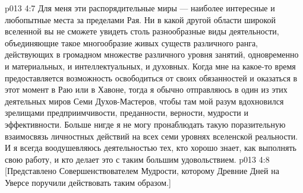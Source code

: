 \vs p013 4:7 Для меня эти распорядительные миры --- наиболее интересные и любопытные места за пределами Рая. Ни в какой другой области широкой вселенной вы не сможете увидеть столь разнообразные виды деятельности, объединяющие такое многообразие живых существ различного ранга, действующих в громадном множестве различного уровня занятий, одновременно и материальных, и интеллектуальных, и духовных. Когда мне на какое\hyp{}то время предоставляется возможность освободиться от своих обязанностей и оказаться в этот момент в Раю или в Хавоне, тогда я обычно отправляюсь в один из этих деятельных миров Семи Духов\hyp{}Мастеров, чтобы там мой разум вдохновился зрелищами предприимчивости, преданности, верности, мудрости и эффективности. Больше нигде я не могу пронаблюдать такую поразительную взаимосвязь личностных действий на всех семи уровнях вселенской реальности. И я всегда воодушевляюсь деятельностью тех, кто хорошо знает, как выполнять свою работу, и кто делает это с таким большим удовольствием.
\vs p013 4:8 [Представлено Совершенствователем Мудрости, которому Древние Дней на Уверсе поручили действовать таким образом.]
